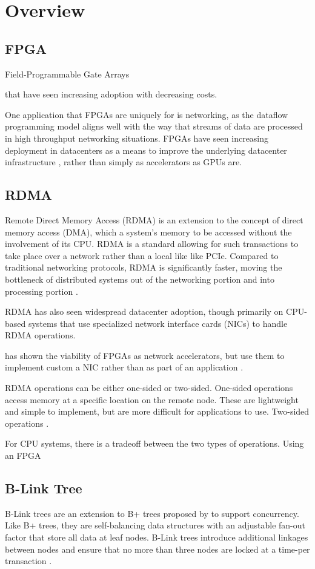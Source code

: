 \section{Overview}

\subsection{FPGA}

Field-Programmable Gate Arrays

that have seen increasing adoption with decreasing costs.

One application that FPGAs are uniquely for is networking, as the dataflow programming model aligns well with the way that streams of data are processed in high throughput networking situations. FPGAs have seen increasing deployment in datacenters as a means to improve the underlying datacenter infrastructure \cite{bobda-trets-2022,fang-vldb-2020}, rather than simply as accelerators as GPUs are.


\subsection{RDMA}

Remote Direct Memory Access (RDMA) is an extension to the concept of direct memory access (DMA), which a system's memory to be accessed without the involvement of its CPU. RDMA is a standard allowing for such transactions to take place over a network rather than a local like like PCIe. Compared to traditional networking protocols, RDMA is significantly faster, moving the bottleneck of distributed systems out of the networking portion and into processing portion \cite{binnig-vldb-2016}.

RDMA has also seen widespread datacenter adoption, though primarily on CPU-based systems that use specialized network interface cards (NICs) to handle RDMA operations.

\citet{star} has shown the viability of FPGAs as network accelerators, but \citeauthor{star} use them to implement custom a NIC rather than as part of an application \cite{star}.

RDMA operations can be either one-sided or two-sided. One-sided operations access memory at a specific location on the remote node. These are lightweight and simple to implement, but are more difficult for applications to use. Two-sided operations  \cite{base}.

For CPU systems, there is a tradeoff between the two types of operations. Using an FPGA


\subsection{B-Link Tree}

B-Link trees are an extension to B+ trees proposed by \citeauthor{b-link} to support concurrency. Like B+ trees, they are self-balancing data structures with an adjustable fan-out factor that store all data at leaf nodes. B-Link trees introduce additional linkages between nodes and ensure that no more than three nodes are locked at a time-per transaction \cite{b-link}.

